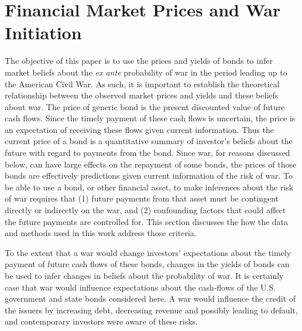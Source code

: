 \section{Financial Market Prices and War Initiation}
\label{acw_onset:sec:risky-bond-pricing}

The objective of this paper is to use the prices and yields of bonds to infer market beliefs about the \textit{ex ante} probability of war in the period leading up to the American Civil War.
As such, it is important to establish the theoretical relationship between the observed market prices and yields and these beliefs about war.
The price of generic bond is the present discounted value of future cash flows.
Since the timely payment of these cash flows is uncertain, the price is an expectation of receiving these flows given current information.
Thus the current price of a bond is a quantitative summary of investor's beliefs about the future with regard to payments from the bond.
Since war, for reasons discussed below, can have large effects on the repayment of some bonds, the prices of those bonds are effectively predictions given current information of the risk of war.
To be able to use a bond, or other financial asset, to make inferences about the risk of war requires that (1) future payments from that asset must be contingent directly or indirectly on the war, and (2) confounding factors that could affect the future payments are controlled for.
This section discusses the how the data and methods used in this work address those criteria.

To the extent that a war would change investors' expectations about the timely payment of future cash flows of these bonds, changes in the yields of bonds can be used to infer changes in beliefs about the probability of war.
It is certainly case that war would influence expectations about the cash-flows of the U.S. government and state bonds considered here.
A war would influence the credit of the issuers by increasing debt, decreasing revenue and possibly leading to default, and contemporary investors were aware of these risks.

